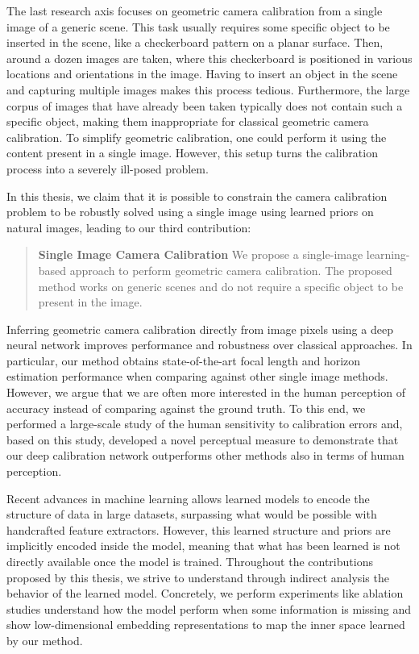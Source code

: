 The last research axis focuses on geometric camera calibration from a single image of a generic scene. This task usually requires some specific object to be inserted in the scene, like a checkerboard pattern on a planar surface. Then, around a dozen images are taken, where this checkerboard is positioned in various locations and orientations in the image. Having to insert an object in the scene and capturing multiple images makes this process tedious. Furthermore, the large corpus of images that have already been taken typically does not contain such a specific object, making them inappropriate for classical geometric camera calibration. To simplify geometric calibration, one could perform it using the content present in a single image. However, this setup turns the calibration process into a severely ill-posed problem. 

In this thesis, we claim that it is possible to constrain the camera calibration problem to be robustly solved using a single image using learned priors on natural images, leading to our third contribution: 

\begin{quotation}
\textbf{Single Image Camera Calibration} We propose a single-image learning-based approach to perform geometric camera calibration. The proposed method works on generic scenes and do not require a specific object to be present in the image. 
\end{quotation}

Inferring geometric camera calibration directly from image pixels using a deep neural network improves performance and robustness over classical approaches. In particular, our method obtains state-of-the-art focal length and horizon estimation performance when comparing against other single image methods. However, we argue that we are often more interested in the human perception of accuracy instead of comparing against the ground truth. To this end, we performed a large-scale study of the human sensitivity to calibration errors and, based on this study, developed a novel perceptual measure to demonstrate that our deep calibration network outperforms other methods also in terms of human perception. 

Recent advances in machine learning allows learned models to encode the structure of data in large datasets, surpassing what would be possible with handcrafted feature extractors. However, this learned structure and priors are implicitly encoded inside the model, meaning that what has been learned is not directly available once the model is trained. Throughout the contributions proposed by this thesis, we strive to understand through indirect analysis the behavior of the learned model. Concretely, we perform experiments like ablation studies understand how the model perform when some information is missing and show low-dimensional embedding representations to map the inner space learned by our method. 

